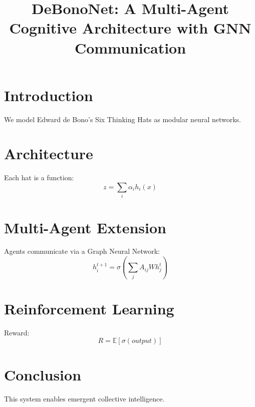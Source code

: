 \documentclass{article}
\title{DeBonoNet: A Multi-Agent Cognitive Architecture with GNN Communication}
\author{ }
\begin{document}
\maketitle

\section{Introduction}
We model Edward de Bono's Six Thinking Hats as modular neural networks.

\section{Architecture}
Each hat is a function:
\[
z = \sum_i \alpha_i h_i(x)
\]

\section{Multi-Agent Extension}
Agents communicate via a Graph Neural Network:
\[
h_i^{t+1} = \sigma\left( \sum_j A_{ij} W h_j^t \right)
\]

\section{Reinforcement Learning}
Reward:
\[
R = \mathbb{E}[\sigma(output)]
\]

\section{Conclusion}
This system enables emergent collective intelligence.
\end{document}
